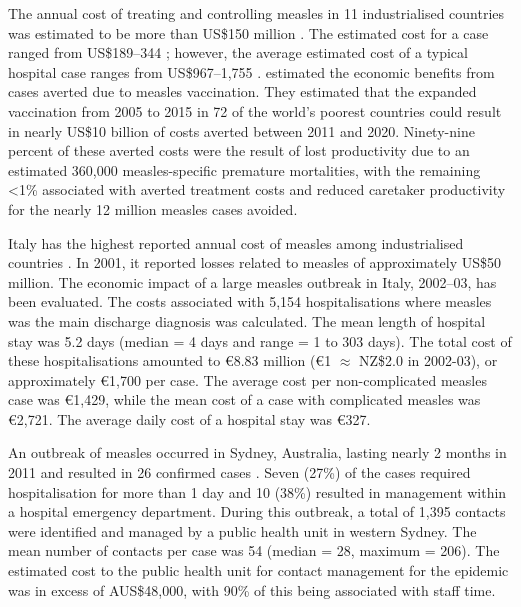 \documentclass{article}
\begin{document}
The annual cost of treating and controlling measles in 11 industrialised countries was estimated to be more than US\$150 million \citep{carabin3}. The estimated cost for a case ranged from US\$189--344 \citep{carabin3}; however, the average estimated cost of a typical hospital case ranges from US\$967--1,755 \citep{carabin2}. \citep{stack11} estimated the economic benefits from cases averted due to measles vaccination. They estimated that the expanded vaccination from 2005 to 2015 in 72 of the world's poorest countries could result in nearly US\$10 billion of costs averted between 2011 and 2020. Ninety-nine percent of these averted costs were the result of lost productivity due to an estimated 360,000 measles-specific premature mortalities, with the remaining <1\% associated with averted treatment costs and reduced caretaker productivity for the nearly 12 million measles cases avoided.

Italy has the highest reported annual cost of measles among industrialised countries \citep{carabin3}. In 2001, it reported losses related to measles of approximately US\$50 million. The economic impact of a large measles outbreak in Italy, 2002--03, has been evaluated. The costs associated with 5,154 hospitalisations where measles was the main discharge diagnosis was calculated. The mean length of hospital stay was 5.2 days (median = 4 days and range = 1 to 303 days). The total cost of these hospitalisations amounted to \euro 8.83 million (\euro 1 $\approx$ NZ\$2.0 in 2002-03), or approximately \euro 1,700 per case. The average cost per non-complicated measles case was  \euro 1,429, while the mean cost of a case with complicated measles was  \euro 2,721. The average daily cost of a hospital stay was  \euro 327.

An outbreak of measles occurred in Sydney, Australia, lasting nearly 2 months in 2011 and resulted in 26 confirmed cases \citep{flego13}. Seven (27\%) of the cases required hospitalisation for more than 1 day and 10 (38\%) resulted in management within a hospital emergency department. During this outbreak, a total of 1,395 contacts were identified and managed by a public health unit in western Sydney. The mean number of contacts per case was 54 (median = 28, maximum = 206). The estimated cost to the public health unit for contact management for the epidemic was in excess of AUS\$48,000, with 90\% of this being associated with staff time. 
\end{document}
